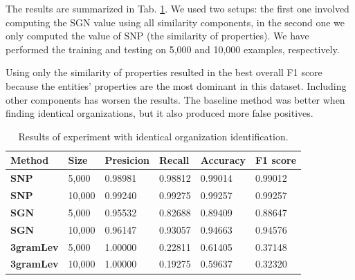 \documentclass{llncs}
\begin{document}
The results are summarized in Tab. \ref{tab3}. We used two setups: the first one
involved computing the SGN value using all similarity components, in the second
one we only computed the value of SNP (the similarity of properties). We have
performed the training and testing on 5,000 and 10,000 examples, respectively.

Using only the similarity of properties resulted in the best overall F1 score
because the entities' properties are the most dominant in this dataset. Including
other components has worsen the results. The baseline method was better when
finding identical organizations, but it also produced more false positives.

\begin{table}
\centering
\renewcommand\tablename{Table}
\caption{Results of experiment with identical organization identification.}
\label{tab3}
\begin{tabular}{|l|l|l|l|l|l|}
\hline
Method            & Size   & \textbf{Presicion} & \textbf{Recall} & \textbf{Accuracy} & \textbf{F1 score} \\ \hline
\textbf{SNP}      & 5,000  & 0.98981            & 0.98812         & 0.99014           & 0.99012           \\ \hline
\textbf{SNP}      & 10,000 & 0.99240            & 0.99275         & 0.99257           & 0.99257           \\ \hline
\textbf{SGN}      & 5,000  & 0.95532            & 0.82688         & 0.89409           & 0.88647           \\ \hline
\textbf{SGN}      & 10,000 & 0.96147            & 0.93057         & 0.94663           & 0.94576           \\ \hline
\textbf{3gramLev} & 5,000  & 1.00000            & 0.22811         & 0.61405           & 0.37148           \\ \hline
\textbf{3gramLev} & 10,000 & 1.00000            & 0.19275         & 0.59637           & 0.32320           \\ \hline
\end{tabular}
\end{table}
\end{document}
